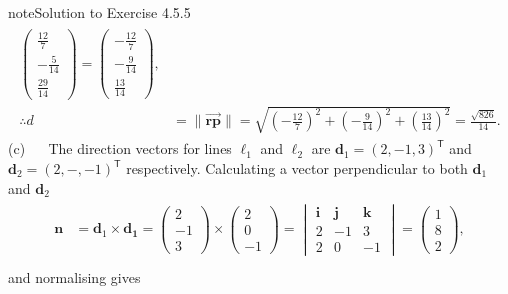 \documentclass[letterpaper,10pt,english]{jupyterBook}
\begin{document}
\begin{sphinxadmonition}{note}{Solution to Exercise 4.5.5}
\begin{equation*}
\begin{split}
\begin{align*}
    \begin{pmatrix} \frac{12}{7} \\ -\frac{5}{14} \\ \frac{29}{14} \end{pmatrix} =
    \begin{pmatrix} -\frac{12}{7} \\ -\frac{9}{14} \\ \frac{13}{14} \end{pmatrix}, \\
    \therefore d &= \|\overrightarrow{\mathbf{rp}}\| = 
    \sqrt{\left(-\frac{12}{7}\right)^2 + \left(-\frac{9}{14}\right)^2 + \left(\frac{13}{14}\right)^2} 
    = \frac{\sqrt{826}}{14}.
\end{align*} \end{split}
\end{equation*}
\sphinxAtStartPar
(c)   The direction vectors for lines \(\ell_1\) and \(\ell_2\) are \(\mathbf{d}_1 = (2, -1, 3)^\mathsf{T}\) and \(\mathbf{d}_2 = (2, -, -1)^\mathsf{T}\) respectively. Calculating a vector perpendicular to both \(\mathbf{d}_1\) and \(\mathbf{d}_2\)
\begin{equation*}
\begin{split} \begin{align*}
    \mathbf{n} &= \mathbf{d}_1 \times \mathbf{d_1} = \begin{pmatrix} 2 \\ -1 \\ 3 \end{pmatrix} \times
    \begin{pmatrix} 2 \\ 0 \\ -1 \end{pmatrix} =
    \begin{vmatrix}
        \mathbf{i} & \mathbf{j} & \mathbf{k} \\
        2 & -1 & 3 \\
        2 & 0 & -1 
    \end{vmatrix} = 
    \begin{pmatrix} 1 \\ 8 \\ 2 \end{pmatrix}, \\
\end{align*} \end{split}
\end{equation*}
\sphinxAtStartPar
and normalising gives
\begin{equation*}
\begin{split} \begin{align*}

\end{align*}
\end{split}
\end{equation*}
\end{sphinxadmonition}
\end{document}
